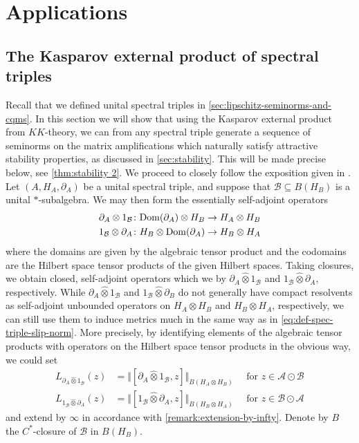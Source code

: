 \documentclass[11pt, a4paper, oneside, final, reqno]{amsart}
\newcommand{\calA}{\mathcal{A}}
\newcommand{\calB}{\mathcal{B}}
\theoremstyle{definition}
\theoremstyle{plain}
\theoremstyle{remark}
\numberwithin{equation}{section}
\begin{document}
\section{Applications}\label{sec:applications}

\subsection{The Kasparov external product of spectral triples}\label{sec:Kasparov-products}

Recall that we defined unital spectral triples in \cref{sec:lipschitz-seminorms-and-cqms}. In this section we will show that using the Kasparov external product from $KK$-theory, we can from any spectral triple generate a sequence of seminorms on the matrix amplifications which naturally satisfy attractive stability properties, as discussed in \cref{sec:stability}. This will be made precise below, see \cref{thm:stability 2}. We proceed to closely follow the exposition given in \cite{Kaad24}. Let $(A,H_A,\partial_A)$ be a unital spectral triple, and suppose that $\calB \subseteq B(H_B)$ is a unital $*$-subalgebra. We may then form the essentially self-adjoint operators
\begin{equation*}
    \begin{split}
        \partial_A \otimes 1_{\calB} &\colon {\rm Dom}(\partial_A) \otimes H_B \to H_A \otimes H_B \\
        1_{\calB} \otimes \partial_A &\colon H_B \otimes {\rm Dom}(\partial_A) \to H_B \otimes H_A
    \end{split}
\end{equation*}
where the domains are given by the algebraic tensor product and the codomains are the Hilbert space tensor products of the given Hilbert spaces.
Taking closures, we obtain closed, self-adjoint operators which we by $\partial_A \widehat{\otimes} 1_{\calB}$ and $1_{\calB} \widehat{\otimes} \partial_A$, respectively. 
While $\partial_A \widehat{\otimes} 1_{\calB}$ and $1_{\calB} \widehat{\otimes} \partial_B$ do not generally have compact resolvents as self-adjoint unbounded operators on $H_A \otimes H_B$ and $H_B \otimes H_A$, respectively, we can still use them to induce metrics much in the same way as in \eqref{eq:def-spec-triple-slip-norm}. More precisely, by identifying elements of the algebraic tensor products with operators on the Hilbert space tensor products in the obvious way, we could set
\begin{equation}\label{eq:seminorms-from-partial-diracs}
    \begin{split}
        L_{\partial_A \widehat{\otimes}1_{\calB}} (z) &= \Vert [\partial_A \widehat{\otimes}1_{\calB}, z] \Vert_{B(H_A \otimes H_B)} \quad \text{ for $z \in \calA \odot \calB$} \\
        L_{1_{\calB} \widehat{\otimes}\partial_A}(z) &= \Vert [1_{\calB}\widehat{\otimes}\partial_A, z] \Vert_{B(H_B \otimes H_A)} \quad \text{ for $z \in \calB \odot \calA$} 
    \end{split}
\end{equation}
and extend by $\infty$ in accordance with \cref{remark:extension-by-infty}. Denote by $B$ the $C^*$-closure of $\calB$ in $B(H_B)$.
\end{document}
